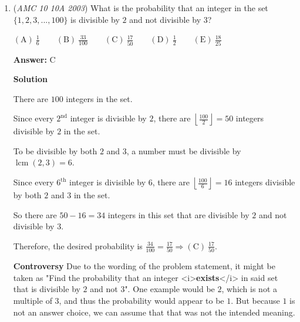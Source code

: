 \begin{enumerate}
 $\mathrm{(A) \ } 12\qquad \mathrm{(B) \ } 15\qquad \mathrm{(C) \ } 18\qquad \mathrm{(D) \ } 21\qquad \mathrm{(E) \ } 24$

 \textbf{Answer: }A



\textbf{Solution 1}

Since we want $n$ to be as large as possible, we would like $d$ in $10d+e$ to be as large as possible. So, $d=7,$ the greatest single-digit prime. Then, $e$ cannot be $5$ because $10(7)+5 = 75,$ which is not prime. So $e = 3$. Therefore, $d \cdot e \cdot (10d+e) = 7 \cdot 3 \cdot 73 = 1533$.So, the sum of the digits of $n$ is $1+5+3+3=12 \Rightarrow \boxed{\mathrm{(A)}\ 12}$ ~ MathGenius\_ (Edited by Sophia866)

 


	\item (\textit{AMC 10 10A 2003}) What is the probability that an integer in the set $\{1,2,3,...,100\}$ is divisible by $2$ and not divisible by $3$? 


 $\mathrm{(A) \ } \frac{1}{6}\qquad \mathrm{(B) \ }  \frac{33}{100}\qquad \mathrm{(C) \ }  \frac{17}{50}\qquad \mathrm{(D) \ }  \frac{1}{2}\qquad \mathrm{(E) \ }  \frac{18}{25}$

 \textbf{Answer: }C



\textbf{Solution}

There are $100$ integers in the set. 

 Since every $2^{\text{nd}}$ integer is divisible by $2$, there are $\left\lfloor\frac{100}{2}\right\rfloor = 50$ integers divisible by $2$ in the set. 

 To be divisible by both $2$ and $3$, a number must be divisible by $\operatorname{lcm}(2,3)=6$.

 Since every $6^{\text{th}}$ integer is divisible by $6$, there are $\left\lfloor\frac{100}{6}\right\rfloor = 16$ integers divisible by both $2$ and $3$ in the set. 

 So there are $50-16=34$ integers in this set that are divisible by $2$ and not divisible by $3$. 

 Therefore, the desired probability is $\frac{34}{100}=\frac{17}{50}\Rightarrow\boxed{\mathrm{(C)}\ \frac{17}{50}}$.

 \textbf{Controversy} Due to the wording of the problem statement, it might be taken as "Find the probability that an integer <i>\textbf{exists}</i> in said set that is divisible by $2$ and not $3$". One example would be $2$, which is not a multiple of $3$, and thus the probability would appear to be $1$. But because $1$ is not an answer choice, we can assume that that was not the intended meaning.


\end{enumerate}
